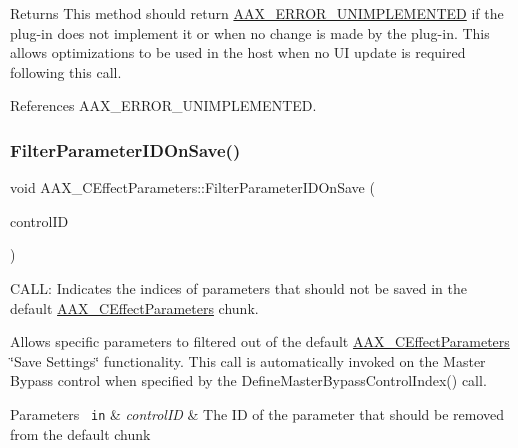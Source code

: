 \begin{DoxyReturn}{Returns}
This method should return \mbox{\hyperlink{a00494_a5f8c7439f3a706c4f8315a9609811937a3b76994b32b97fcd56b19ef8032245df}{A\+A\+X\+\_\+\+E\+R\+R\+O\+R\+\_\+\+U\+N\+I\+M\+P\+L\+E\+M\+E\+N\+T\+ED}} if the plug-\/in does not implement it or when no change is made by the plug-\/in. This allows optimizations to be used in the host when no UI update is required following this call. 
\end{DoxyReturn}


References A\+A\+X\+\_\+\+E\+R\+R\+O\+R\+\_\+\+U\+N\+I\+M\+P\+L\+E\+M\+E\+N\+T\+ED.

\mbox{\label{a01481_a06251bbdd6ad5d6ccee160ce4cb5ee8c}} 
\subsubsection{\texorpdfstring{FilterParameterIDOnSave()}{FilterParameterIDOnSave()}}
{\footnotesize\ttfamily void A\+A\+X\+\_\+\+C\+Effect\+Parameters\+::\+Filter\+Parameter\+I\+D\+On\+Save (\begin{DoxyParamCaption}\item[{\mbox{\hyperlink{a00392_a1440c756fe5cb158b78193b2fc1780d1}{A\+A\+X\+\_\+\+C\+Param\+ID}}}]{control\+ID }\end{DoxyParamCaption})\hspace{0.3cm}{\ttfamily [protected]}}



C\+A\+LL\+: Indicates the indices of parameters that should not be saved in the default \mbox{\hyperlink{a01481}{A\+A\+X\+\_\+\+C\+Effect\+Parameters}} chunk. 

Allows specific parameters to filtered out of the default \mbox{\hyperlink{a01481}{A\+A\+X\+\_\+\+C\+Effect\+Parameters}} \char`\"{}\+Save
\+Settings\char`\"{} functionality. This call is automatically invoked on the Master Bypass control when specified by the Define\+Master\+Bypass\+Control\+Index() call.


\begin{DoxyParams}[1]{Parameters}
\mbox{\texttt{ in}}  & {\em control\+ID} & The ID of the parameter that should be removed from the default chunk \\
\hline
\end{DoxyParams}
\mbox{\label{a01481_a0fd3465f1a37beb0c9d8be5e33a5cf58}} 
